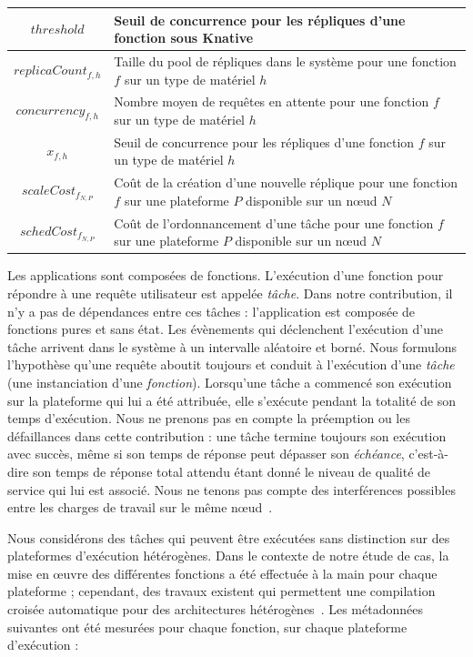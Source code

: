 \begin{table}[!ht]
\begin{center}
{\begin{tabularx}{\linewidth}{|c|Z|}
            $threshold$ & Seuil de concurrence pour les répliques d'une fonction sous Knative \\ \hline
            $replicaCount_{f, h}$ & Taille du pool de répliques dans le système pour une fonction $f$ sur un type de matériel $h$ \\ \hline
            $concurrency_{f, h}$ & Nombre moyen de requêtes en attente pour une fonction $f$ sur un type de matériel $h$ \\ \hline
            $x_{f, h}$ & Seuil de concurrence pour les répliques d'une fonction $f$ sur un type de matériel $h$ \\ \hline
            $scaleCost_{{f}_{N, P}}$ & Coût de la création d'une nouvelle réplique pour une fonction $f$ sur une plateforme $P$ disponible sur un nœud $N$ \\ \hline
            $schedCost_{{f}_{N, P}}$ & Coût de l'ordonnancement d'une tâche pour une fonction $f$ sur une plateforme $P$ disponible sur un nœud $N$ \\ \hline
        \end{tabularx}
    }
    \label{table:herofake-notation}
    \end{center}
\end{table}

Les applications sont composées de fonctions. L'exécution d'une fonction pour répondre à une requête utilisateur est appelée \textit{tâche}. Dans notre contribution, il n'y a pas de dépendances entre ces tâches : l'application est composée de fonctions pures et sans état. Les évènements qui déclenchent l'exécution d'une tâche arrivent dans le système à un intervalle aléatoire et borné. Nous formulons l'hypothèse qu'une requête aboutit toujours et conduit à l'exécution d'une \textit{tâche} (une instanciation d'une \textit{fonction}). Lorsqu'une tâche a commencé son exécution sur la plateforme qui lui a été attribuée, elle s'exécute pendant la totalité de son temps d'exécution. Nous ne prenons pas en compte la préemption ou les défaillances dans cette contribution : une tâche termine toujours son exécution avec succès, même si son temps de réponse peut dépasser son \textit{échéance}, c'est-à-dire son temps de réponse total attendu étant donné le niveau de qualité de service qui lui est associé. Nous ne tenons pas compte des interférences possibles entre les charges de travail sur le même nœud~\cite{dartoisInvestigatingMachineLearning2021}. 

Nous considérons des tâches qui peuvent être exécutées sans distinction sur des plateformes d'exécution hétérogènes. Dans le contexte de notre étude de cas, la mise en œuvre des différentes fonctions a été effectuée à la main pour chaque plateforme ; cependant, des travaux existent qui permettent une compilation croisée automatique pour des architectures hétérogènes~\cite{hortaXartrekRuntimeExecution2021, 10.1145/3445814.3446699}. Les métadonnées suivantes ont été mesurées pour chaque fonction, sur chaque plateforme d'exécution :

